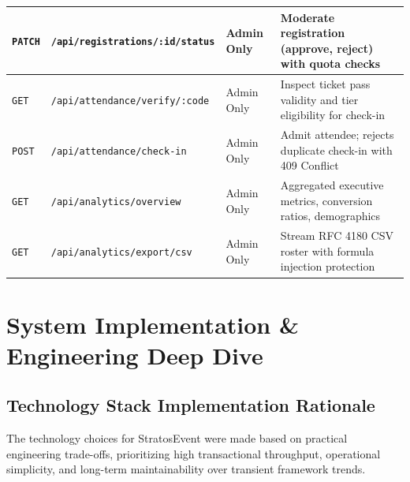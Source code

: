 \documentclass[11pt,a4paper]{report}
\begin{document}
\begin{table}[H]
\begin{tabularx}{\textwidth}{|p{}|p{}|p{}|X|}
\texttt{PATCH} & \texttt{/api/registrations/:id/status} & Admin Only & Moderate registration (approve, reject) with quota checks \\\hline
\texttt{GET} & \texttt{/api/attendance/verify/:code} & Admin Only & Inspect ticket pass validity and tier eligibility for check-in \\\hline
\texttt{POST} & \texttt{/api/attendance/check-in} & Admin Only & Admit attendee; rejects duplicate check-in with 409 Conflict \\\hline
\texttt{GET} & \texttt{/api/analytics/overview} & Admin Only & Aggregated executive metrics, conversion ratios, demographics \\\hline
\texttt{GET} & \texttt{/api/analytics/export/csv} & Admin Only & Stream RFC 4180 CSV roster with formula injection protection \\\hline
\end{tabularx}
\end{table}



\chapter{System Implementation \& Engineering Deep Dive}

\section{Technology Stack Implementation Rationale}
\justifying
The technology choices for StratosEvent were made based on practical engineering trade-offs, prioritizing high transactional throughput, operational simplicity, and long-term maintainability over transient framework trends.
\end{document}
